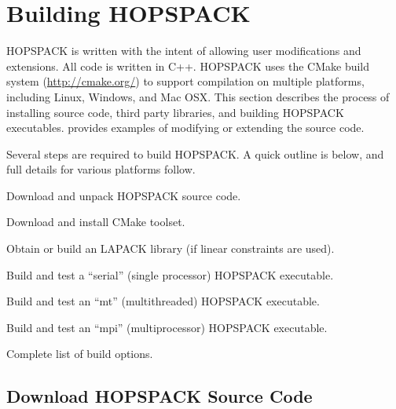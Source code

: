 \clearpage
\section{Building HOPSPACK}
\label{sec:build}

HOPSPACK is written with the intent of allowing user modifications and
extensions.  All code is written in C++.  HOPSPACK uses the CMake build
system (\href{http://cmake.org/}{http://cmake.org/}) to support compilation on
multiple platforms, including Linux, Windows, and Mac OSX.  This section
describes the process of installing source code, third party libraries,
and building HOPSPACK executables.
 provides examples of modifying or extending
the source code.

Several steps are required to build HOPSPACK.  A quick outline is below,
and full details for various platforms follow.
\begin{list}{x}{\setlength{\itemindent}{20pt}
                \setlength{\itemsep}{-4pt}
                \setlength{\labelsep}{10pt}}
  \item[\ref{subinstall:DN}] Download and unpack HOPSPACK source code.
  \item[\ref{subinstall:CM}] Download and install CMake toolset.
  \item[\ref{subinstall:LA}] Obtain or build an LAPACK library (if linear
                             constraints are used).
  \item[\ref{subinstall:SR}] Build and test a ``serial'' (single processor)
                             HOPSPACK executable.
  \item[\ref{subinstall:MT}] Build and test an ``mt'' (multithreaded)
                             HOPSPACK executable.
  \item[\ref{subinstall:MP}] Build and test an ``mpi'' (multiprocessor)
                             HOPSPACK executable.
  \item[\ref{subinstall:ED}] Complete list of build options.
\end{list}


\subsection{Download HOPSPACK Source Code}
\label{subinstall:DN}

